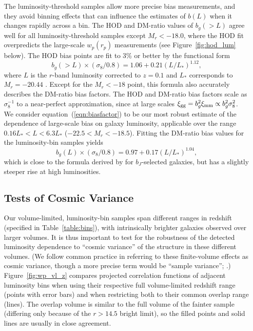 \documentclass[]{emulateapj}
\newcommand{\wrp}{{w_p(r_p)}}
\begin{document}
The luminosity-threshold samples allow more precise bias
measurements, and they avoid binning effects that can influence
the estimates of $b(L)$ when it changes rapidly across a bin.
The HOD and DM-ratio values of $b_g(>L)$ agree well for all
luminosity-threshold samples except $M_r<-18.0$, where the
HOD fit overpredicts the large-scale $\wrp$ measurements
(see Figure~\ref{fig:hod_lum} below).
The HOD bias points are fit to 3\% or better by the functional form 
\begin{equation}
\label{eqn:biasfactor}
b_g(>L) \times (\sigma_8/0.8) = 1.06+0.21(L/L_*)^{1.12},
\end{equation}
where $L$ is the $r$-band luminosity corrected to $z=0.1$ and
$L_*$ corresponds to $M_r=-20.44$ \citep{blanton03c}.
Except for the $M_r<-18$ point, this formula also accurately
describes the DM-ratio bias factors.
The HOD and DM-ratio bias factors scale as $\sigma_8^{-1}$ to a 
near-perfect approximation, since at large scales
$\xi_{\rm gg}=b_g^2\xi_{\rm mm} \propto b_g^2\sigma_8^2$.
We consider equation~(\ref{eqn:biasfactor}) 
to be our most robust estimate of the dependence
of large-scale bias on galaxy luminosity, applicable over the range
$0.16L_* < L < 6.3L_*$ ($-22.5 < M_r < -18.5$).
Fitting the DM-ratio bias values for the luminosity-bin samples yields
\begin{equation}
\label{eqn:biasbin}
b_g(L) \times (\sigma_8/0.8) = 0.97+0.17(L/L_*)^{1.04},
\end{equation}
which is close to the formula derived by \cite{norberg01}
for $b_J$-selected galaxies, but has a slightly steeper
rise at high luminosities.


\subsection{Tests of Cosmic Variance}
\label{subsec:cosmicvariance}

Our volume-limited, luminosity-bin samples span different ranges
in redshift (specified in Table~\ref{table:bins}), with intrinsically
brighter galaxies observed over larger volumes. It is
thus important to test for the robustness of the detected luminosity
dependence to ``cosmic variance'' of the structure in these
different volumes.  (We follow common practice in referring
to these finite-volume effects as cosmic variance, though a
more precise term would be ``sample variance''; \citealt{scott94}.)
Figure~\ref{fig:wp_vl_z} compares projected correlation functions 
of adjacent luminosity bins when using their respective full 
volume-limited redshift range (points with error bars)
and when restricting both to their common 
overlap range (lines). 
The overlap volume is similar to the full volume of the 
fainter sample (differing only because of the $r>14.5$ bright limit),
so the filled points and solid lines are usually in close agreement.
\end{document}
